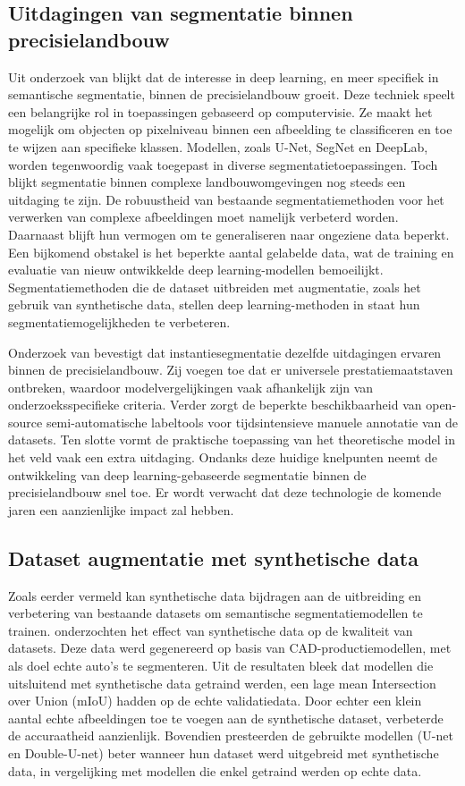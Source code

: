 \subsection{Uitdagingen van segmentatie binnen precisielandbouw}
Uit onderzoek van \textcite{Luo2024} blijkt dat de interesse in deep learning, en meer specifiek in semantische segmentatie, binnen de precisielandbouw groeit. Deze techniek speelt een belangrijke rol in toepassingen gebaseerd op computervisie. Ze maakt het mogelijk om objecten op pixelniveau binnen een afbeelding te classificeren en toe te wijzen aan specifieke klassen. Modellen, zoals U-Net, SegNet en DeepLab, worden tegenwoordig vaak toegepast in diverse segmentatietoepassingen. Toch blijkt segmentatie binnen complexe landbouwomgevingen nog steeds een uitdaging te zijn. De robuustheid van bestaande segmentatiemethoden voor het verwerken van complexe afbeeldingen moet namelijk verbeterd worden. Daarnaast blijft hun vermogen om te generaliseren naar ongeziene data beperkt. Een bijkomend obstakel is het beperkte aantal gelabelde data, wat de training en evaluatie van nieuw ontwikkelde deep learning-modellen bemoeilijkt. Segmentatiemethoden die de dataset uitbreiden met augmentatie, zoals het gebruik van synthetische data, stellen deep learning-methoden in staat hun segmentatiemogelijkheden te verbeteren.

Onderzoek van \textcite{Charisis2024} bevestigt dat instantiesegmentatie dezelfde uitdagingen ervaren binnen de precisielandbouw. Zij voegen toe dat er universele prestatiemaatstaven ontbreken, waardoor modelvergelijkingen vaak afhankelijk zijn van onderzoeksspecifieke criteria. Verder zorgt de beperkte beschikbaarheid van open-source semi-automatische labeltools voor tijdsintensieve manuele annotatie van de datasets. Ten slotte vormt de praktische toepassing van het theoretische model in het veld vaak een extra uitdaging. Ondanks deze huidige knelpunten neemt de ontwikkeling van deep learning-gebaseerde segmentatie binnen de precisielandbouw snel toe. Er wordt verwacht dat deze technologie de komende jaren een aanzienlijke impact zal hebben.

\subsection{Dataset augmentatie met synthetische data}
Zoals eerder vermeld kan synthetische data bijdragen aan de uitbreiding en verbetering van bestaande datasets om semantische segmentatiemodellen te trainen. \textcite{Anderson2022} onderzochten het effect van synthetische data op de kwaliteit van datasets. Deze data werd gegenereerd op basis van CAD-productiemodellen, met als doel echte auto's te segmenteren. Uit de resultaten bleek dat modellen die uitsluitend met synthetische data getraind werden, een lage mean Intersection over Union (mIoU) hadden op de echte validatiedata. Door echter een klein aantal echte afbeeldingen toe te voegen aan de synthetische dataset, verbeterde de accuraatheid aanzienlijk. Bovendien presteerden de gebruikte modellen (U-net en Double-U-net) beter wanneer hun dataset werd uitgebreid met synthetische data, in vergelijking met modellen die enkel getraind werden op echte data.

